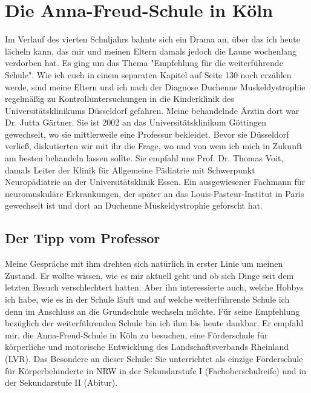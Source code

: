 \documentclass[fontsize=14pt,a4paper,headinclude,DIV=calc,automark]{scrbook}
\begin{document}
\section{Die Anna-Freud-Schule in Köln}

Im Verlauf des vierten Schuljahrs bahnte sich ein Drama an, über das ich heute lächeln kann, das mir und meinen Eltern damals jedoch die Laune wochenlang verdorben hat. Es ging um das Thema "Empfehlung für die weiterführende Schule". Wie ich euch in einem separaten Kapitel auf Seite 130 noch erzählen werde, sind meine Eltern und ich nach der Diagnose Duchenne Muskeldystrophie regelmäßig zu Kontrolluntersuchungen in die Kinderklinik des Universitätsklinikums Düsseldorf gefahren. Meine behandelnde Ärztin dort war Dr. Jutta Gärtner. Sie ist 2002 an das Universitätsklinikum Göttingen gewechselt, wo sie mittlerweile eine Professur bekleidet. Bevor sie Düsseldorf verließ, diskutierten wir mit ihr die Frage, wo und von wem ich mich in Zukunft am besten behandeln lassen sollte. Sie empfahl uns Prof. Dr. Thomas Voit, damals Leiter der Klinik für Allgemeine Pädiatrie mit Schwerpunkt Neuropädiatrie an der Universitätsklinik Essen. Ein ausgewiesener Fachmann für neuromuskuläre Erkrankungen, der später an das Louis-Pasteur-Institut in Paris gewechselt ist und dort an Duchenne Muskeldystrophie geforscht hat.

\subsection{Der Tipp vom Professor}

Meine Gespräche mit ihm drehten sich natürlich in erster Linie um meinen Zustand. Er wollte wissen, wie es mir aktuell geht und ob sich Dinge seit dem letzten Besuch verschlechtert hatten. Aber ihn interessierte auch, welche Hobbys ich habe, wie es in der Schule läuft und auf welche weiterführende Schule ich denn im Anschluss an die Grundschule wechseln möchte. Für seine Empfehlung bezüglich der weiterführenden Schule bin ich ihm bis heute dankbar. Er empfahl mir, die Anna-Freud-Schule in Köln zu besuchen, eine Förderschule für körperliche und motorische Entwicklung des Landschaftsverbands Rheinland (LVR). Das Besondere an dieser Schule: Sie unterrichtet als einzige Förderschule für Körperbehinderte in NRW in der Sekundarstufe I (Fachoberschulreife) und in der Sekundarstufe II (Abitur).
\end{document}
